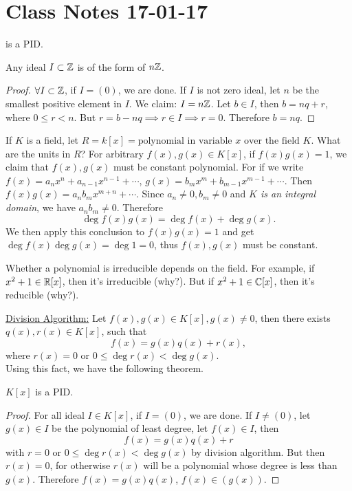 \section{Class Notes 17-01-17}
\begin{example}
\Z{} is a PID.
\end{example}
\begin{remark}
Any ideal $I\subset\mathbb{Z}$ is of the form of $n\mathbb{Z}$.
\end{remark}
\begin{proof}
$\forall I\subset \mathbb{Z}$, if $I=(0)$, we are done. If $I$ is not zero ideal, let $n$ be the smallest positive element in $I$. We claim: $I=n\mathbb{Z}$. Let $b\in I$, then $b=nq+r$, where $0\leq r<n$. But $r=b-nq\implies r\in I\implies r=0$. Therefore $b= nq$. 
\end{proof}
If $K$ is a field, let $R = k[x] = \mbox{polynomial in variable $x$ over the field $K$}$. What are the units in $R$? For arbitrary $f(x),g(x)\in K[x]$, if $f(x)g(x)=1$, we claim that $f(x), g(x)$ must be constant polynomial. For if we write $f(x)=a_nx^n+a_{n-1}x^{n-1}+\cdots$, $g(x)=b_mx^m+b_{m-1}x^{m-1}+\cdots$. Then $f(x)g(x) = a_nb_m x^{m+n}+\cdots$. Since $a_n\ne0,b_m\ne0$ and \emph{$K$ is an integral domain}, we have $a_nb_m\ne0$. Therefore $$\deg{f(x)g(x)} = \deg{f(x)}+\deg{g(x)}.$$ We then apply this conclusion to $f(x)g(x) = 1$ and get $\deg{f(x)}\deg{g(x)} = \deg{1} = 0$, thus $f(x), g(x)$ must be constant.
\begin{remark}
Whether a polynomial is irreducible depends on the field. For example, if $x^2+1\in \mathbb{R}[x]$, then it's irreducible (why?). But if $x^2+1\in \mathbb{C}[x]$, then it's reducible (why?).
\end{remark}
\underline{Division Algorithm:} Let $f(x), g(x)\in K[x], g(x)\ne 0$, then there exists $q(x),r(x)\in K[x]$, such that $$f(x)=g(x)q(x)+r(x),$$where $r(x)=0$ or $0\leq\deg{r(x)}<\deg{g(x)}$. \\
Using this fact, we have the following theorem.
\begin{theorem}\label{kxpid}
$K[x]$ is a PID.
\end{theorem}
\begin{proof}
For all ideal $I\in K[x]$, if $I=(0)$, we are done. If $I\ne(0)$, let $g(x)\in I$ be the polynomial of least degree, let $f(x)\in I$, then $$f(x)=g(x)q(x)+r$$with $r=0$ or $0\leq\deg{r(x)}<\deg{g(x)}$ by division algorithm. But then $r(x)=0$, for otherwise $r(x)$ will be a polynomial whose degree is less than $g(x)$. Therefore $f(x)=g(x)q(x)$, $f(x)\in (g(x))$.
\end{proof}
